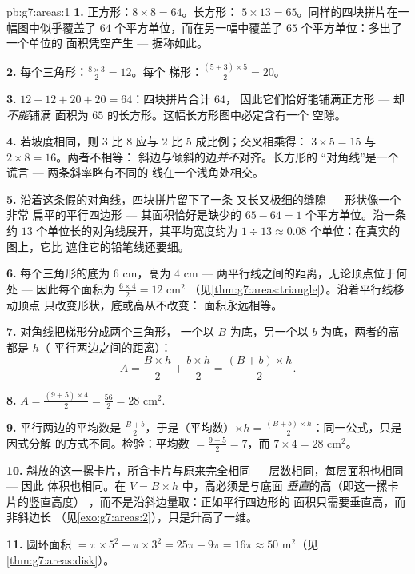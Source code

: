 \begin{solution}{pb:g7:areas:1}
\textbf{1.} 正方形：$8 \times 8 = 64$。长方形：
$5 \times 13 = 65$。同样的四块拼片在一幅图中似乎覆盖了 $64$
个平方单位，而在另一幅中覆盖了 $65$ 个平方单位：多出了一个单位的
面积凭空产生 --- 据称如此。

\textbf{2.} 每个三角形：$\frac{8 \times 3}{2} = 12$。每个
梯形：$\frac{(5 + 3) \times 5}{2} = 20$。

\textbf{3.} $12 + 12 + 20 + 20 = 64$：四块拼片合计 $64$，
因此它们恰好能铺满正方形 --- 却\emph{不能}铺满
面积为 $65$ 的长方形。这幅长方形图中必定含有一个
空隙。

\textbf{4.} 若坡度相同，则 $3$ 比 $8$
应与 $2$ 比 $5$ 成比例；交叉相乘得：
$3 \times 5 = 15$ 与 $2 \times 8 = 16$。两者不相等：
斜边与倾斜的边\emph{并不}对齐。长方形的
“对角线”是一个谎言 --- 两条斜率略有不同的
线在一个浅角处相交。

\textbf{5.} 沿着这条假的对角线，四块拼片留下了一条
又长又极细的缝隙 --- 形状像一个非常
扁平的平行四边形 --- 其面积恰好是缺少的
$65 - 64 = 1$ 个平方单位。沿一条约
$13$ 个单位长的对角线展开，其平均宽度约为
$1 \div 13 \approx 0.08$ 个单位：在真实的图上，它比
遮住它的铅笔线还要细。

\textbf{6.} 每个三角形的底为 $6$ cm，高为 $4$ cm ---
两平行线之间的距离，无论顶点位于何处 ---
因此每个面积为 $\frac{6 \times 4}{2} = 12$ cm$^2$
（见\cref{thm:g7:areas:triangle}）。沿着平行线移动顶点
只改变形状，底或高从不改变：
面积永远相等。

\textbf{7.} 对角线把梯形分成两个三角形，
一个以 $B$ 为底，另一个以 $b$ 为底，两者的高都是 $h$（
平行两边之间的距离）：
\[
A = \frac{B \times h}{2} + \frac{b \times h}{2}
= \frac{(B + b) \times h}{2} .
\]

\textbf{8.} $A = \frac{(9 + 5) \times 4}{2} = \frac{56}{2} =
28$ cm$^2$.

\textbf{9.} 平行两边的平均数是
$\frac{B + b}{2}$，于是（平均数）$\times h =
\frac{(B+b) \times h}{2}$：同一公式，只是因式分解
的方式不同。检验：平均数 $= \frac{9+5}{2} = 7$，而
$7 \times 4 = 28$ cm$^2$。

\textbf{10.} 斜放的这一摞卡片，所含卡片与原来完全相同
--- 层数相同，每层面积也相同 --- 因此
体积也相同。在 $V = B \times h$ 中，高必须是与底面
\emph{垂直}的高（即这一摞卡片的竖直高度）
，而不是沿斜边量取：正如平行四边形的
面积只需要垂直高，而非斜边长
（见\cref{exo:g7:areas:2}），只是升高了一维。

\textbf{11.} 圆环面积 $= \pi \times 5^2 - \pi \times 3^2 = 25\pi -
9\pi = 16\pi \approx 50$ m$^2$（见\cref{thm:g7:areas:disk}）。


\end{solution}
